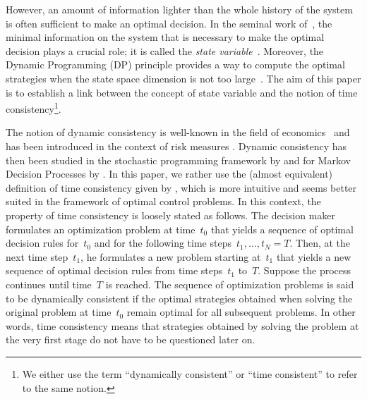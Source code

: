 \documentclass[a4paper]{amsart}
\theoremstyle{plain}
\theoremstyle{definition}
\theoremstyle{remark}
\begin{document}
However, an amount of information lighter than the whole history
of the system is often sufficient to make an optimal decision. In
the seminal work of~\citet{Bellman57}, the minimal information on
the system that is necessary to make the optimal decision plays a
crucial role; it is called the \emph{state
variable}~\citep[see][for a more formal definition]{Whittle}.
Moreover, the Dynamic Programming (DP) principle provides a way to
compute the optimal strategies when the state space dimension is
not too large~\citep[see][for a broad overview on
DP]{BertsekasDP}. The aim of this paper is to establish a link
between the concept of state variable and the notion of time
consistency\footnote{We either use the term ``dynamically
consistent'' or ``time consistent'' to refer to the same notion.}.

The notion of dynamic consistency is well-known in the field of
economics~\citep[see][]{Hammond:1989} and has been introduced in
the context of risk measures \citep[see][for definitions and
properties of coherent and consistent dynamic risk
measures]{Artzner_AOR_2007,Riedel_SPA_2004,Detlefsen_FS_2005,Cheridito_EJP_2006}.
Dynamic consistency has then been studied in the stochastic
programming framework by \citet{Shapiro_ORL_2009} and for Markov
Decision Processes by \citet{Ruszczynski_OO_2009}. In this paper,
we rather use the (almost equivalent) definition of time
consistency given by \cite{Ekeland_arXiv_2006}, which is more
intuitive and seems better suited in the framework of optimal
control problems. In this context, the property of time
consistency is loosely stated as follows. The decision maker
formulates an optimization problem at time~$t_0$ that yields a
sequence of optimal decision rules for~$t_0$ and for the following
time steps~$t_1, \dots, t_N=T$. Then, at the next time step~$t_1$,
he formulates a new problem starting at~$t_1$ that yields a new
sequence of optimal decision rules from time steps~$t_1$ to~$T$.
Suppose the process continues until time~$T$ is reached. The
sequence of optimization problems is said to be dynamically
consistent if the optimal strategies obtained when solving the
original problem at time~$t_{0}$ remain optimal for all subsequent
problems. In other words, time consistency means that strategies
obtained by solving the problem at the very first stage do not
have to be questioned later on.
\end{document}
